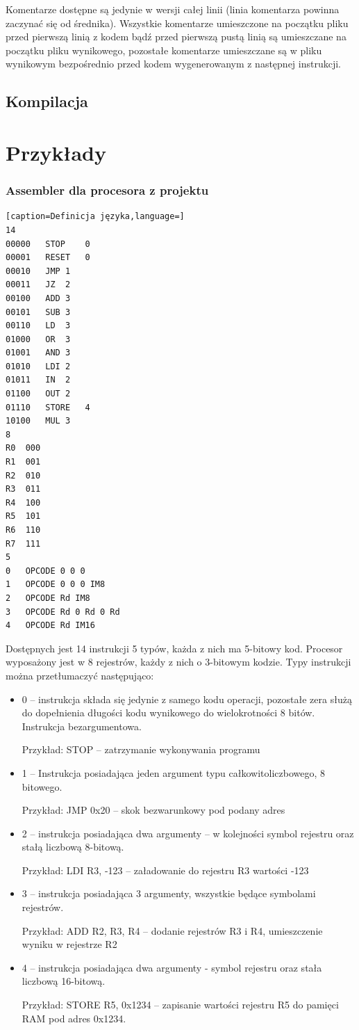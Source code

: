 \documentclass[a4paper,12pt]{report}
\begin{document}
Komentarze dostępne są jedynie w wersji całej linii (linia komentarza powinna zaczynać się od średnika). Wszystkie komentarze umieszczone na początku pliku przed pierwszą linią z kodem bądź przed pierwszą pustą linią są umieszczane na początku pliku wynikowego, pozostałe komentarze umieszczane są w pliku wynikowym bezpośrednio przed kodem wygenerowanym z następnej instrukcji.

\subsection{Kompilacja}

\section{Przykłady}

\subsubsection{Assembler dla procesora z projektu}
\lstset{
tabsize=6
}
\begin{lstlisting}[caption=Definicja języka,language=]
14
00000	STOP	0
00001	RESET	0
00010	JMP	1
00011	JZ	2
00100	ADD	3
00101	SUB	3
00110	LD	3
01000	OR	3
01001	AND	3
01010	LDI	2
01011	IN	2
01100	OUT	2
01110	STORE	4
10100	MUL	3
8
R0	000
R1	001
R2	010
R3	011
R4	100
R5	101
R6	110
R7	111
5
0	OPCODE 0 0 0
1	OPCODE 0 0 0 IM8
2	OPCODE Rd IM8
3	OPCODE Rd 0 Rd 0 Rd
4	OPCODE Rd IM16
\end{lstlisting}

Dostępnych jest 14 instrukcji 5 typów, każda z nich ma 5-bitowy kod. Procesor wyposażony jest w 8 rejestrów, każdy z nich o 3-bitowym kodzie. Typy instrukcji można przetłumaczyć następująco:
\begin{itemize}
  \item 0 -- instrukcja składa się jedynie z samego kodu operacji, pozostałe zera służą do dopełnienia długości kodu wynikowego do wielokrotności 8 bitów. Instrukcja bezargumentowa.

  Przykład: STOP -- zatrzymanie wykonywania programu
  \item 1 -- Instrukcja posiadająca jeden argument typu całkowitoliczbowego, 8 bitowego. 

  Przykład: JMP 0x20 -- skok bezwarunkowy pod podany adres
  \item 2 -- instrukcja posiadająca dwa argumenty -- w kolejności symbol rejestru oraz stałą liczbową 8-bitową.
  
  Przykład: LDI R3, -123 -- załadowanie do rejestru R3 wartości -123
  \item 3 -- instrukcja posiadająca 3 argumenty, wszystkie będące symbolami rejestrów.

  Przykład: ADD R2, R3, R4 -- dodanie rejestrów R3 i R4, umieszczenie wyniku w rejestrze R2
  \item 4 -- instrukcja posiadająca dwa argumenty - symbol rejestru oraz stała liczbową 16-bitową.

  Przykład: STORE R5, 0x1234 -- zapisanie wartości rejestru R5 do pamięci RAM pod adres 0x1234.
\end{itemize}
\end{document}
